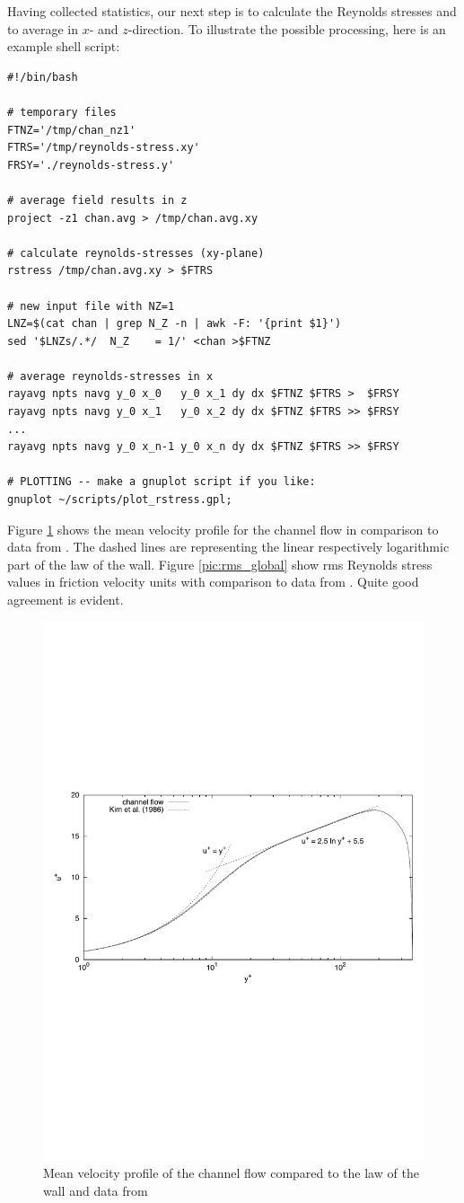 \documentclass[11pt]{report}
\begin{document}
Having collected statistics, our next step is to calculate the
Reynolds stresses and to average in $x$- and $z$-direction. To
illustrate the possible processing, here is an example shell script:

{\small
\begin{verbatim}
#!/bin/bash

# temporary files
FTNZ='/tmp/chan_nz1'
FTRS='/tmp/reynolds-stress.xy'
FRSY='./reynolds-stress.y'

# average field results in z
project -z1 chan.avg > /tmp/chan.avg.xy

# calculate reynolds-stresses (xy-plane)
rstress /tmp/chan.avg.xy > $FTRS

# new input file with NZ=1
LNZ=$(cat chan | grep N_Z -n | awk -F: '{print $1}')
sed '$LNZs/.*/  N_Z    = 1/' <chan >$FTNZ

# average reynolds-stresses in x
rayavg npts navg y_0 x_0   y_0 x_1 dy dx $FTNZ $FTRS >  $FRSY
rayavg npts navg y_0 x_1   y_0 x_2 dy dx $FTNZ $FTRS >> $FRSY
...
rayavg npts navg y_0 x_n-1 y_0 x_n dy dx $FTNZ $FTRS >> $FRSY

# PLOTTING -- make a gnuplot script if you like:
gnuplot ~/scripts/plot_rstress.gpl;
\end{verbatim}
}

Figure \ref{pic:u_wall} shows the mean velocity profile for the
channel flow in comparison to data from \citet{kmm87}. The dashed
lines are representing the linear respectively logarithmic part of the
law of the wall.  Figure \ref{pic:rms_global} show rms Reynolds stress
values in friction velocity units with comparison to data from
\citet{kmm87}.  Quite good agreement is evident.

\begin{figure}
\centering
\includegraphics[height=0.28\linewidth]{dns_u_wall}
\caption{Mean velocity profile of the channel flow compared to the law
  of the wall and data from \citet{kmm87}}
\label{pic:u_wall}
\end{figure}
\end{document}
